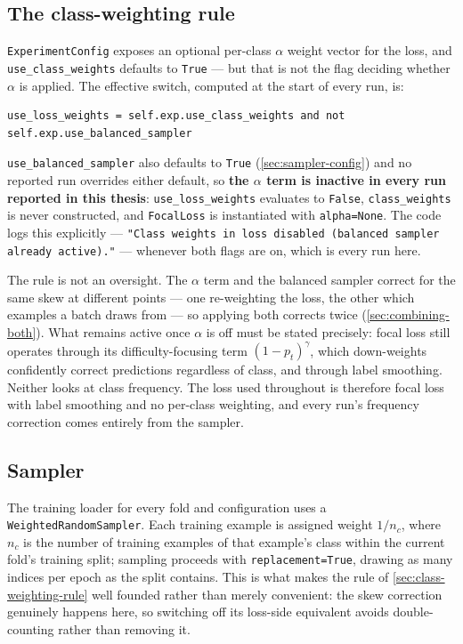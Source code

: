 \subsection{The class-weighting rule}
\label{sec:class-weighting-rule}

\texttt{ExperimentConfig} exposes an optional per-class $\alpha$ weight vector for the loss, and \texttt{use\_class\_weights} defaults to \texttt{True} --- but that is not the flag deciding whether $\alpha$ is applied. The effective switch, computed at the start of every run, is:

\begin{verbatim}
use_loss_weights = self.exp.use_class_weights and not self.exp.use_balanced_sampler
\end{verbatim}

\texttt{use\_balanced\_sampler} also defaults to \texttt{True} (\autoref{sec:sampler-config}) and no reported run overrides either default, so \textbf{the $\alpha$ term is inactive in every run reported in this thesis}: \texttt{use\_loss\_weights} evaluates to \texttt{False}, \texttt{class\_weights} is never constructed, and \texttt{FocalLoss} is instantiated with \texttt{alpha=None}. The code logs this explicitly --- \texttt{"Class weights in loss disabled (balanced sampler already active)."} --- whenever both flags are on, which is every run here.

The rule is not an oversight. The $\alpha$ term and the balanced sampler correct for the same skew at different points --- one re-weighting the loss, the other which examples a batch draws from --- so applying both corrects twice (\autoref{sec:combining-both}). What remains active once $\alpha$ is off must be stated precisely: focal loss still operates through its difficulty-focusing term $(1-p_t)^\gamma$, which down-weights confidently correct predictions regardless of class, and through label smoothing. Neither looks at class frequency. The loss used throughout is therefore focal loss with label smoothing and no per-class weighting, and every run's frequency correction comes entirely from the sampler.

\subsection{Sampler}
\label{sec:sampler-config}

The training loader for every fold and configuration uses a \texttt{WeightedRandomSampler}. Each training example is assigned weight $1/n_c$, where $n_c$ is the number of training examples of that example's class within the current fold's training split; sampling proceeds with \texttt{replacement=True}, drawing as many indices per epoch as the split contains. This is what makes the rule of \autoref{sec:class-weighting-rule} well founded rather than merely convenient: the skew correction genuinely happens here, so switching off its loss-side equivalent avoids double-counting rather than removing it.

